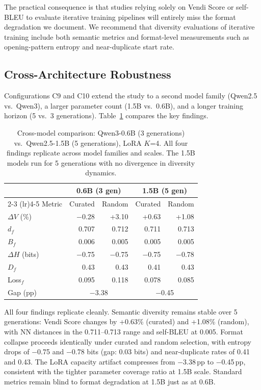 \documentclass[11pt,a4paper]{article}
\begin{document}
The practical consequence is that studies relying solely on Vendi Score or self-BLEU to evaluate iterative training pipelines will entirely miss the format degradation we document. We recommend that diversity evaluations of iterative training include both semantic metrics and format-level measurements such as opening-pattern entropy and near-duplicate start rate.

\subsection{Cross-Architecture Robustness}
\label{sec:crossmodel}

Configurations C9 and C10 extend the study to a second model family (Qwen2.5 vs.\ Qwen3), a larger parameter count (1.5B vs.\ 0.6B), and a longer training horizon (5 vs.\ 3 generations). Table~\ref{tab:crossmodel} compares the key findings.

\begin{table}[t]
\centering
\caption{Cross-model comparison: Qwen3-0.6B (3 generations) vs.\ Qwen2.5-1.5B (5 generations), LoRA $K$=4. All four findings replicate across model families and scales. The 1.5B models run for 5 generations with no divergence in diversity dynamics.}
\label{tab:crossmodel}
\footnotesize
\begin{tabular}{lrrrr}
\toprule
& \multicolumn{2}{c}{0.6B (3 gen)} & \multicolumn{2}{c}{1.5B (5 gen)} \\
\cmidrule(lr){2-3} \cmidrule(lr){4-5}
Metric & Curated & Random & Curated & Random \\
\midrule
$\Delta V$ (\%) & $-$0.28 & +3.10 & +0.63 & +1.08 \\
$d_f$ & 0.707 & 0.712 & 0.711 & 0.713 \\
$B_f$ & 0.006 & 0.005 & 0.005 & 0.005 \\
$\Delta H$ (bits) & $-$0.75 & $-$0.75 & $-$0.75 & $-$0.78 \\
$D_f$ & 0.43 & 0.43 & 0.41 & 0.43 \\
Loss$_f$ & 0.095 & 0.118 & 0.078 & 0.085 \\
\midrule
Gap (pp) & \multicolumn{2}{c}{$-$3.38} & \multicolumn{2}{c}{$-$0.45} \\
\bottomrule
\end{tabular}
\end{table}

All four findings replicate cleanly. Semantic diversity remains stable over 5 generations: Vendi Score changes by +0.63\% (curated) and +1.08\% (random), with NN distances in the 0.711--0.713 range and self-BLEU at 0.005. Format collapse proceeds identically under curated and random selection, with entropy drops of $-$0.75 and $-$0.78 bits (gap: 0.03 bits) and near-duplicate rates of 0.41 and 0.43. The LoRA capacity artifact compresses from $-$3.38\,pp to $-$0.45\,pp, consistent with the tighter parameter coverage ratio at 1.5B scale. Standard metrics remain blind to format degradation at 1.5B just as at 0.6B.
\end{document}
